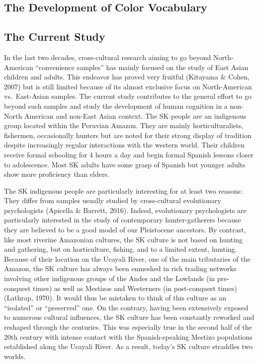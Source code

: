 \documentclass[
  english,
  ,man,floatsintext]{apa6}
\begin{document}
\hypertarget{the-development-of-color-vocabulary}{%
\subsection{The Development of Color Vocabulary}\label{the-development-of-color-vocabulary}}

\hypertarget{the-current-study}{%
\subsection{The Current Study}\label{the-current-study}}

In the last two decades, cross-cultural research aiming to go beyond North-American \enquote{convenience samples} has mainly focused on the study of East Asian children and adults. This endeavor has proved very fruitful (Kitayama \& Cohen, 2007) but is still limited because of its almost exclusive focus on North-American vs.~East-Asian samples. The current study contributes to the general effort to go beyond such samples and study the development of human cognition in a non-North American and non-East Asian context.
The SK people are an indigenous group located within the Peruvian Amazon. They are mainly horticulturalists, fishermen, occasionally hunters but are noted for their strong display of tradition despite increasingly regular interactions with the western world. Their children receive formal schooling for 4 hours a day and begin formal Spanish lessons closer to adolescence. Most SK adults have some grasp of Spanish but younger adults show more proficiency than elders.

The SK indigenous people are particularly interesting for at least two reasons:
They differ from samples usually studied by cross-cultural evolutionary psychologists (Apicella \& Barrett, 2016). Indeed, evolutionary psychologists are particularly interested in the study of contemporary hunter-gatherers because they are believed to be a good model of our Pleistocene ancestors. By contrast, like most riverine Amazonian cultures, the SK culture is not based on hunting and gathering, but on horticulture, fishing, and to a limited extent, hunting.
Because of their location on the Ucayali River, one of the main tributaries of the Amazon, the SK culture has always been enmeshed in rich trading networks involving other indigenous groups of the Andes and the Lowlands (in pre-conquest times) as well as Mestizos and Westerners (in post-conquest times) (Lathrap, 1970). It would thus be mistaken to think of this culture as an \enquote{isolated} or \enquote{preserved} one. On the contrary, having been extensively exposed to numerous cultural influences, the SK culture has been constantly reworked and reshaped through the centuries. This was especially true in the second half of the 20th century with intense contact with the Spanish-speaking Mestizo populations established along the Ucayali River. As a result, today's SK culture straddles two worlds.
\end{document}
